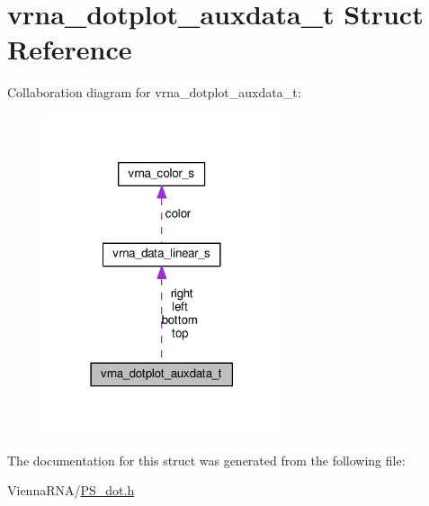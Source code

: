\hypertarget{structvrna__dotplot__auxdata__t}{}\section{vrna\+\_\+dotplot\+\_\+auxdata\+\_\+t Struct Reference}
\label{structvrna__dotplot__auxdata__t}


Collaboration diagram for vrna\+\_\+dotplot\+\_\+auxdata\+\_\+t\+:
\nopagebreak
\begin{figure}[H]
\begin{center}
\leavevmode
\includegraphics[width=198pt]{structvrna__dotplot__auxdata__t__coll__graph}
\end{center}
\end{figure}


The documentation for this struct was generated from the following file\+:\begin{DoxyCompactItemize}
\item 
Vienna\+R\+N\+A/\hyperlink{PS__dot_8h}{P\+S\+\_\+dot.\+h}\end{DoxyCompactItemize}
